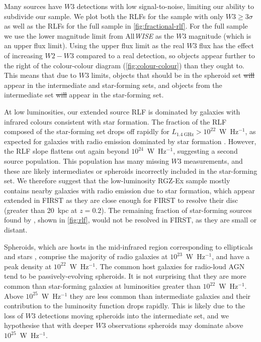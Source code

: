 \documentclass[11pt, a4paper]{book}
\providecommand{\DIFaddtex}[1]{{\protect\color{blue}\uwave{#1}}} %
\providecommand{\DIFdeltex}[1]{{\protect\color{red}\sout{#1}}}                      %
\providecommand{\DIFaddbegin}{} %
\providecommand{\DIFaddend}{} %
\providecommand{\DIFdelbegin}{} %
\providecommand{\DIFdelend}{} %
\providecommand{\DIFadd}[1]{\texorpdfstring{\DIFaddtex{#1}}{#1}} %
\providecommand{\DIFdel}[1]{\texorpdfstring{\DIFdeltex{#1}}{}} %
\newcommand{\DIFscaledelfig}{0.5}
\newlength{\DIFdelgraphicswidth} %
\newlength{\DIFdelgraphicsheight} %
\newcommand{\DIFaddincludegraphics}[2][]{{\color{blue}\fbox{\DIFOincludegraphics[#1]{#2}}}} %
\newcommand{\DIFdelincludegraphics}[2][]{%
\sbox{\DIFdelgraphicsbox}{\DIFOincludegraphics[#1]{#2}}%
\settoboxwidth{\DIFdelgraphicswidth}{\DIFdelgraphicsbox} %
\settoboxtotalheight{\DIFdelgraphicsheight}{\DIFdelgraphicsbox} %
\scalebox{\DIFscaledelfig}{%
\parbox[b]{\DIFdelgraphicswidth}{\usebox{\DIFdelgraphicsbox}\\[-\baselineskip] \rule{\DIFdelgraphicswidth}{0em}}\llap{\resizebox{\DIFdelgraphicswidth}{\DIFdelgraphicsheight}{%
\setlength{\unitlength}{\DIFdelgraphicswidth}%
\begin{picture}(1,1)%
\thicklines\linethickness{2pt} %
{\color[rgb]{1,0,0}\put(0,0){\framebox(1,1){}}}%
{\color[rgb]{1,0,0}\put(0,0){\line( 1,1){1}}}%
{\color[rgb]{1,0,0}\put(0,1){\line(1,-1){1}}}%
\end{picture}%
}\hspace*{3pt}}} %
} %
\DeclareRobustCommand{\DIFaddbegin}{\DIFOaddbegin \let\includegraphics\DIFaddincludegraphics} %
\DeclareRobustCommand{\DIFaddend}{\DIFOaddend \let\includegraphics\DIFOincludegraphics} %
\DeclareRobustCommand{\DIFdelbegin}{\DIFOdelbegin \let\includegraphics\DIFdelincludegraphics} %
\DeclareRobustCommand{\DIFdelend}{\DIFOaddend \let\includegraphics\DIFOincludegraphics} %
\begin{document}
      Many sources have $W3$ detections with low signal-to-noise, limiting our ability to subdivide our sample. We plot both the RLFs for the sample with only $W3 \geq 3 \sigma$ as well as the RLFs for the full sample in \autoref{fig:fractional-rlf}. For the full sample we use the lower magnitude limit from All\emph{WISE} as the $W3$ magnitude (which is an upper flux limit). Using the upper flux limit as the real $W3$ flux has the effect of increasing $W2 - W3$ compared to a real detection, so objects appear further to the right of the colour-colour diagram (\autoref{fig:colour-colour}) than they ought to. This means that due to $W3$ limits, objects that should be in the spheroid set \DIFdelbegin \DIFdel{will }\DIFdelend \DIFaddbegin \DIFadd{instead }\DIFaddend appear in the intermediate and star-forming sets, and objects from the intermediate set \DIFdelbegin \DIFdel{will }\DIFdelend \DIFaddbegin \DIFadd{instead }\DIFaddend appear in the star-forming set.

      At low luminosities, our extended source RLF is dominated by galaxies with infrared
      colours consistent with star formation. The fraction
      of the RLF composed of the star-forming set drops off rapidly for
      $L_{1.4\ \mathrm{GHz}} > 10^{22}$~W~Hz$^{-1}$, as expected for galaxies with radio emission
      dominated by star formation \citep[e.g.][]{mauch07rlf}. However, the RLF slope flattens out again beyond $10^{24}$~W~Hz$^{-1}$, suggesting a second source population. This population has many missing $W3$ measurements, and these are likely intermediates or spheroids incorrectly included in the star-forming set. We therefore suggest that the
      low-luminosity RGZ-Ex sample mostly contains nearby galaxies with radio
      emission due to star formation, which appear extended in FIRST as they
      are close enough for FIRST to resolve their
      disc (greater than 20~kpc at $z = 0.2$). The remaining fraction of star-forming sources found by
      \citet{mauch07rlf}, shown in
      \autoref{fig:rlf}, would not be resolved in FIRST, as they are small or
      distant.

      Spheroids, which are hosts in the mid-infrared region corresponding to ellipticals and stars \citep{wright10wise}, comprise the majority of radio galaxies at $10^{23}$~W~Hz$^{-1}$,
      and have a peak density at $10^{22}$~W~Hz$^{-1}$. The common host galaxies for radio-loud AGN tend to be passively-evolving spheroids. It is not surprising that they are more common than star-forming galaxies at luminosities greater than $10^{22}$~W~Hz$^{-1}$. Above
      $10^{25}$~W~Hz$^{-1}$ they are less common than intermediate galaxies and
      their contribution to the luminosity function drops rapidly. This is likely due to the loss of $W3$ detections moving spheroids into the intermediate set, and we hypothesise that with deeper $W3$ observations spheroids may dominate above $10^{25}$~W~Hz$^{-1}$.
\end{document}

